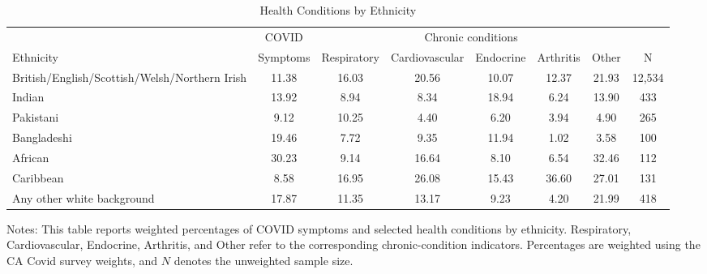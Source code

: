 \begin{table}[htbp]
\centering
\caption{Health Conditions by Ethnicity}
\label{tab:ethnicity_health}
\begin{threeparttable}
\footnotesize
\begin{tabular*}{\textwidth}{@{\extracolsep{\fill}}p{5.2cm}ccccccc}
\toprule
& \multicolumn{1}{c}{COVID} & \multicolumn{5}{c}{Chronic conditions} & \\
\cmidrule(lr){2-2}\cmidrule(lr){3-7}
Ethnicity & Symptoms & Respiratory & Cardiovascular & Endocrine & Arthritis & Other & N \\
\midrule
British/English/Scottish/Welsh/Northern Irish & 11.38 & 16.03 & 20.56 & 10.07 & 12.37 & 21.93 & 12,534 \\
Indian & 13.92 & 8.94 & 8.34 & 18.94 & 6.24 & 13.90 & 433 \\
Pakistani & 9.12 & 10.25 & 4.40 & 6.20 & 3.94 & 4.90 & 265 \\
Bangladeshi & 19.46 & 7.72 & 9.35 & 11.94 & 1.02 & 3.58 & 100 \\
African & 30.23 & 9.14 & 16.64 & 8.10 & 6.54 & 32.46 & 112 \\
Caribbean & 8.58 & 16.95 & 26.08 & 15.43 & 36.60 & 27.01 & 131 \\
Any other white background & 17.87 & 11.35 & 13.17 & 9.23 & 4.20 & 21.99 & 418 \\
\bottomrule
\end{tabular*}
\begin{tablenotes}[flushleft]
\footnotesize
\item Notes: This table reports weighted percentages of COVID symptoms and selected health conditions by ethnicity. Respiratory, Cardiovascular, Endocrine, Arthritis, and Other refer to the corresponding chronic-condition indicators. Percentages are weighted using the CA Covid survey weights, and \(N\) denotes the unweighted sample size.
\end{tablenotes}
\end{threeparttable}
\end{table}